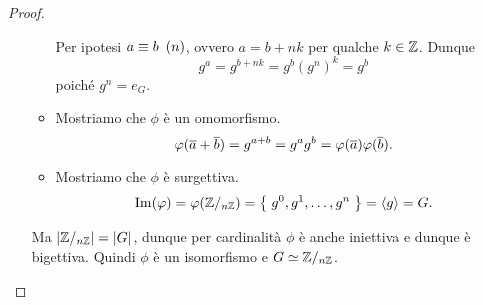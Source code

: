 \begin{proof}
\begin{enumerate}[label={(\roman*)}]
\begin{itemize}
            Per ipotesi $a \congr b \Mod{n}$, ovvero $a = b+nk$ per qualche $k \in \Z$. Dunque \[
                g^a = g^{b + nk} = g^b(g^n)^k = g^b    
            \] poiché $g^n = e_G$.
            \item Mostriamo che $\phi$ è un omomorfismo. \[
                \phi(\eqclass a + \eqclass b) = g^{a + b} = g^ag^b = \phi(\eqclass a)\phi(\eqclass b).
            \] \item Mostriamo che $\phi$ è surgettiva. \[
                \Im \phi = \phi(\Zmod n) = \set{g^0, g^1, \dots, g^n} = \cycl g = G.    
            \]
        \end{itemize}
        Ma $\abs*{\Zmod n} = \abs*{G}$, dunque per cardinalità $\phi$ è anche iniettiva e dunque è bigettiva. 
        Quindi $\phi$ è un isomorfismo e $G \isomorph \Zmod n$.
    \end{enumerate}
\end{proof}

